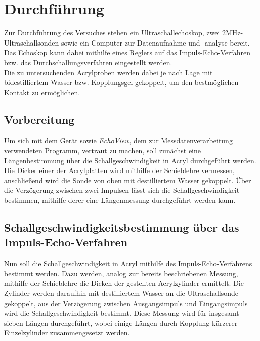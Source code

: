 \section{Durchführung}
\label{sec:Durchführung}

Zur Durchführung des Versuches stehen ein Ultraschallechoskop, zwei $2 \unit{\mega\hertz}$-Ultraschallsonden sowie ein Computer zur Datenaufnahme und -analyse bereit.
Das Echoskop kann dabei mithilfe eines Reglers auf das Impuls-Echo-Verfahren bzw. das Durchschallungsverfahren eingestellt werden. \\

Die zu untersuchenden Acrylproben werden dabei je nach Lage mit bidestilliertem Wasser bzw. Kopplungsgel gekoppelt, um den bestmöglichen Kontakt zu ermöglichen. \\


\subsection*{Vorbereitung}

Um sich mit dem Gerät sowie \textit{EchoView}, dem zur Messdatenverarbeitung verwendeten Programm, vertraut zu machen, soll zunächst eine Längenbestimmung über die Schallgeschwindigkeit in Acryl durchgeführt werden.
Die Dicker einer der Acrylplatten wird mithilfe der Schieblehre vermessen, anschließend wird die Sonde von oben mit destilliertem Wasser gekoppelt. 
Über die Verzögerung zwischen zwei Impulsen lässt sich die Schallgeschwindigkeit bestimmen, mithilfe derer eine Längenmessung durchgeführt werden kann. \\


\subsection*{Schallgeschwindigkeitsbestimmung über das Impuls-Echo-Verfahren}

Nun soll die Schallgeschwindigkeit in Acryl mithilfe des Impuls-Echo-Verfahrens bestimmt werden.
Dazu werden, analog zur bereits beschriebenen Messung, mithilfe der Schieblehre die Dicken der gestellten Acrylzylinder ermittelt.
Die Zylinder werden daraufhin mit destilliertem Wasser an die Ultraschallsonde gekoppelt, aus der Verzögerung zwischen Ausgangsimpuls und Eingangsimpuls wird die Schallgeschwindigkeit bestimmt.
Diese Messung wird für insgesamt sieben Längen durchgeführt, wobei einige Längen durch Kopplung kürzerer Einzelzylinder zusammengesetzt werden. \\


